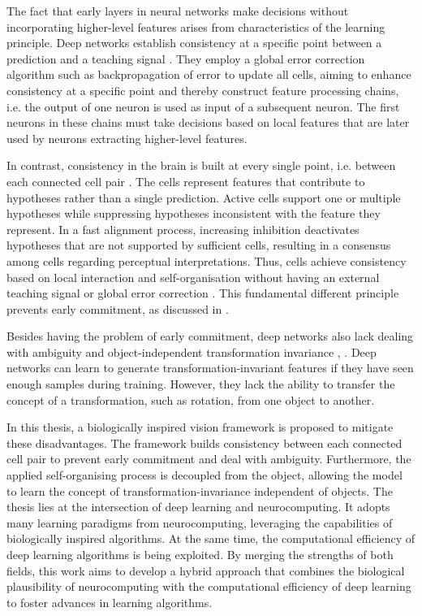 The fact that early layers in neural networks make decisions without incorporating higher-level features arises from characteristics of the learning principle.
Deep networks establish consistency at a specific point between a prediction and a teaching signal .
They employ a global error correction algorithm such as backpropagation of error  to update all cells, aiming to enhance consistency at a specific point and thereby construct feature processing chains, i.e. the output of one neuron is used as input of a subsequent neuron.
The first neurons in these chains must take decisions based on local features that are later used by neurons extracting higher-level features.

In contrast, consistency in the brain is built at every single point, i.e. between each connected cell pair .
The cells represent features that contribute to hypotheses rather than a single prediction.
Active cells support one or multiple hypotheses while suppressing hypotheses inconsistent with the feature they represent.
In a fast alignment process, increasing inhibition  deactivates hypotheses that are not supported by sufficient cells, resulting in a consensus among cells regarding perceptual interpretations.
Thus, cells achieve consistency based on local interaction and self-organisation  without having an external teaching signal or global error correction . This fundamental different principle prevents early commitment, as discussed in .

Besides having the problem of early commitment, deep networks also lack dealing with ambiguity and object-independent transformation invariance , \cite{madan_when_2022}.
Deep networks can learn to generate transformation-invariant features if they have seen enough samples during training.
However, they lack the ability to transfer the concept of a transformation, such as rotation, from one object to another.

In this thesis, a biologically inspired vision framework is proposed to mitigate these disadvantages. 
The framework builds consistency between each connected cell pair to prevent early commitment and deal with ambiguity.
Furthermore, the applied self-organising process is decoupled from the object, allowing the model to learn the concept of transformation-invariance independent of objects.
The thesis lies at the intersection of deep learning and neurocomputing. It adopts many learning paradigms from neurocomputing, leveraging the capabilities of biologically inspired algorithms. At the same time, the computational efficiency of deep learning algorithms is being exploited. By merging the strengths of both fields, this work aims to develop a hybrid approach that combines the biological plausibility of neurocomputing with the computational efficiency of deep learning to foster advances in learning algorithms.


